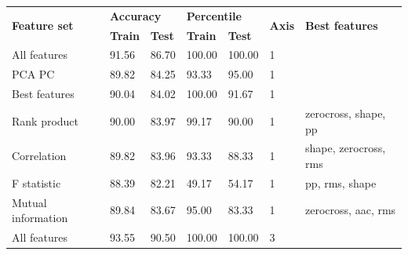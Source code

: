 \begin{table}[]
\begin{tabular}{|l|ll|ll|l|l|}
\hline
\multirow{2}{*}{\textbf{Feature set}} & \multicolumn{2}{l|}{\textbf{Accuracy}}              & \multicolumn{2}{l|}{\textbf{Percentile}}            & \multirow{2}{*}{\textbf{Axis}} & \multirow{2}{*}{\textbf{Best features}} \\ \cline{2-5}
                                      & \multicolumn{1}{l|}{\textbf{Train}} & \textbf{Test} & \multicolumn{1}{l|}{\textbf{Train}} & \textbf{Test} &                                &                                         \\ \hline
All features                          & \multicolumn{1}{l|}{91.56}          & 86.70         & \multicolumn{1}{l|}{100.00}         & 100.00        & 1                              &                                         \\ \hline
PCA PC                                & \multicolumn{1}{l|}{89.82}          & 84.25         & \multicolumn{1}{l|}{93.33}          & 95.00         & 1                              &                                         \\ \hline
Best features                         & \multicolumn{1}{l|}{90.04}          & 84.02         & \multicolumn{1}{l|}{100.00}         & 91.67         & 1                              &                                         \\ \hline
Rank product                          & \multicolumn{1}{l|}{90.00}          & 83.97         & \multicolumn{1}{l|}{99.17}          & 90.00         & 1                              & zerocross, shape, pp                    \\ \hline
Correlation                           & \multicolumn{1}{l|}{89.82}          & 83.96         & \multicolumn{1}{l|}{93.33}          & 88.33         & 1                              & shape, zerocross, rms                   \\ \hline
F statistic                           & \multicolumn{1}{l|}{88.39}          & 82.21         & \multicolumn{1}{l|}{49.17}          & 54.17         & 1                              & pp, rms, shape                          \\ \hline
Mutual information                    & \multicolumn{1}{l|}{89.84}          & 83.67         & \multicolumn{1}{l|}{95.00}          & 83.33         & 1                              & zerocross, aac, rms                     \\ \hline
All features                          & \multicolumn{1}{l|}{93.55}          & 90.50         & \multicolumn{1}{l|}{100.00}         & 100.00        & 3                              &                                         \\ \hline

\end{tabular}
\end{table}
